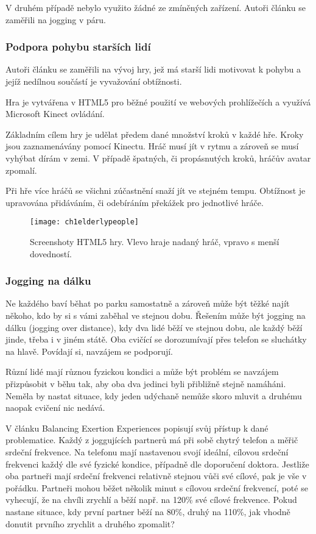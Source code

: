 V druhém případě nebylo využito žádné ze zmíněných zařízení. Autoři článku \cite{7} se zaměřili na jogging v páru. 

\subsubsection{Podpora pohybu starších lidí}

Autoři článku \cite{8} se zaměřili na vývoj hry, jež má starší lidi motivovat k pohybu a jejíž nedílnou součástí je vyvažování obtížnosti. 

Hra je vytvářena v HTML5 pro běžné použití ve webových prohlížečích a využívá Microsoft Kinect ovládání.

Základním cílem hry je udělat předem dané množství kroků v každé hře. Kroky jsou zaznamenávány pomocí Kinectu. Hráč musí jít v rytmu a zároveň se musí vyhýbat dírám v zemi. V případě špatných, či propásnutých kroků, hráčův avatar zpomalí.

Při hře více hráčů se všichni zúčastnění snaží jít ve stejném tempu. Obtížnost je upravována přidáváním, či odebíráním překážek pro jednotlivé hráče.

\begin{figure}
  \centering
  \texttt{[image: ch1elderlypeople]}
	\caption{Screenshoty HTML5 hry. Vlevo hraje nadaný hráč, vpravo s menší dovedností\cite{8}. }
	\label{ch1elderlypeople}
\end{figure}

\subsubsection{Jogging na dálku}

Ne každého baví běhat po parku samostatně a zároveň může být těžké najít někoho, kdo by si s vámi zaběhal ve stejnou dobu. Řešením může být jogging na dálku (jogging over distance), kdy dva lidé běží ve stejnou dobu, ale každý běží jinde, třeba i v jiném státě. Oba cvičící se dorozumívají přes telefon se sluchátky na hlavě. Povídají si, navzájem se podporují.

Různí lidé mají různou fyzickou kondici a může být problém se navzájem přizpůsobit v běhu tak, aby oba dva jedinci byli přibližně stejně namáháni. Neměla by nastat situace, kdy jeden udýchaně nemůže skoro mluvit a druhému naopak cvičení nic nedává.

V článku Balancing Exertion Experiences \cite{7} popisují svůj přístup k dané problematice. Každý z joggujících partnerů má při sobě chytrý telefon a měřič srdeční frekvence. Na telefonu mají nastavenou svojí ideální, cílovou srdeční frekvenci každý dle své fyzické kondice, případně dle doporučení doktora. Jestliže oba partneři mají srdeční frekvenci relativně stejnou vůči své cílové, pak je vše v pořádku. Partneři mohou běžet několik minut s cílovou srdeční frekvencí, poté se vyhecují, že na chvíli zrychlí a běží např. na 120\% své cílové frekvence. Pokud nastane situace, kdy první partner běží na 80\%, druhý na 110\%, jak vhodně donutit prvního zrychlit a druhého zpomalit? 

